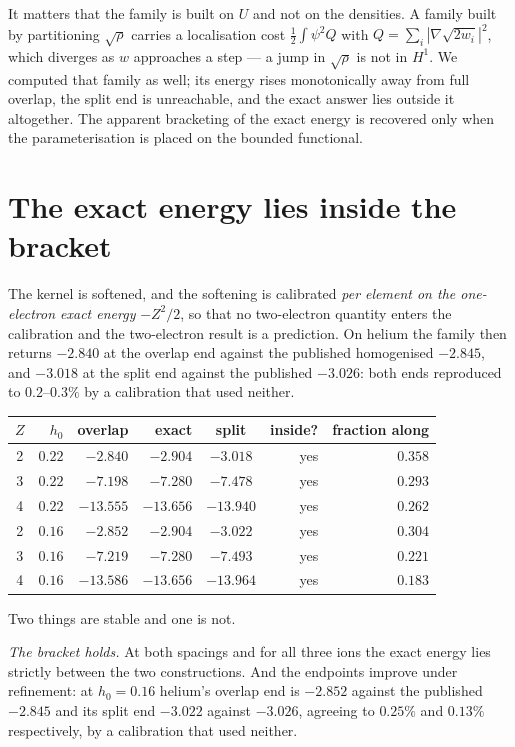 \documentclass[11pt]{article}
\newcommand{\half}{\tfrac12}
\newcommand{\grad}{\nabla}
\begin{document}
It matters that the family is built on $U$ and not on the densities. A family built by partitioning
$\sqrt{\rho}$ carries a localisation cost $\half\!\int\!\psi^2 Q$ with
$Q=\sum_i|\grad\sqrt{2w_i}|^2$, which diverges as $w$ approaches a step --- a jump in $\sqrt{\rho}$
is not in $H^1$. We computed that family as well; its energy rises monotonically away from full
overlap, the split end is unreachable, and the exact answer lies outside it altogether. The
apparent bracketing of the exact energy is recovered only when the parameterisation is placed on the
bounded functional.

\section{The exact energy lies inside the bracket}\label{sec:inside}

The kernel is softened, and the softening is calibrated \emph{per element on the one-electron exact
energy} $-Z^2/2$, so that no two-electron quantity enters the calibration and the two-electron
result is a prediction. On helium the family then returns $-2.840$ at the overlap end against the
published homogenised $-2.845$, and $-3.018$ at the split end against the published $-3.026$: both
ends reproduced to $0.2$--$0.3\%$ by a calibration that used neither.

\begin{center}
\begin{tabular}{crrrcrr}
\toprule
$Z$ & $h_0$ & overlap & exact & split & inside? & fraction along \\
\midrule
2 & $0.22$ & $-2.840$  & $-2.904$  & $-3.018$  & yes & $0.358$ \\
3 & $0.22$ & $-7.198$  & $-7.280$  & $-7.478$  & yes & $0.293$ \\
4 & $0.22$ & $-13.555$ & $-13.656$ & $-13.940$ & yes & $0.262$ \\
\midrule
2 & $0.16$ & $-2.852$  & $-2.904$  & $-3.022$  & yes & $0.304$ \\
3 & $0.16$ & $-7.219$  & $-7.280$  & $-7.493$  & yes & $0.221$ \\
4 & $0.16$ & $-13.586$ & $-13.656$ & $-13.964$ & yes & $0.183$ \\
\bottomrule
\end{tabular}
\end{center}

Two things are stable and one is not.

\emph{The bracket holds.} At both spacings and for all three ions the exact energy lies strictly
between the two constructions. And the endpoints improve under refinement: at $h_0=0.16$ helium's
overlap end is $-2.852$ against the published $-2.845$ and its split end $-3.022$ against $-3.026$,
agreeing to $0.25\%$ and $0.13\%$ respectively, by a calibration that used neither.
\end{document}
